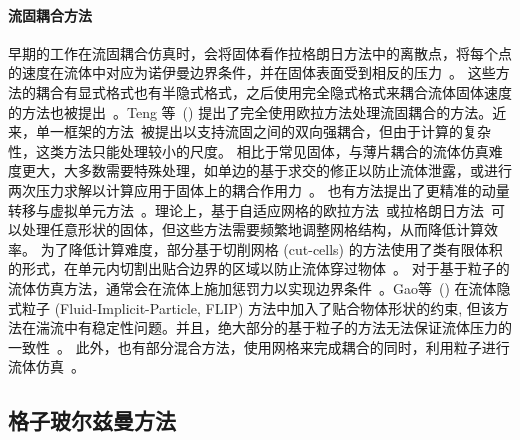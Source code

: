 \paragraph{流固耦合方法}
早期的工作在流固耦合仿真时，会将固体看作拉格朗日方法中的离散点，将每个点的速度在流体中对应为诺伊曼边界条件，并在固体表面受到相反的压力~\cite{Yngve:2000,Foster:2001,Carlson-2004,Takahashi-2002,Genevaux-2003}。
这些方法的耦合有显式格式也有半隐式格式，之后使用完全隐式格式来耦合流体固体速度的方法也被提出~\cite{Klingner-2006,Chentanez:2006:SCP,Batty-2007}。Teng 等~(\citeyear{Teng-2016}) 提出了完全使用欧拉方法处理流固耦合的方法。近来，单一框架的方法~\cite{takahashi-2020,fang-2020}被提出以支持流固之间的双向强耦合，但由于计算的复杂性，这类方法只能处理较小的尺度。
相比于常见固体，与薄片耦合的流体仿真难度更大，大多数需要特殊处理，如单边的基于求交的修正以防止流体泄露，或进行两次压力求解以计算应用于固体上的耦合作用力~\cite{Guendelman-2005}。
也有方法提出了更精准的动量转移与虚拟单元方法~\cite{Robinson-2008,Robinson:2009}。理论上，基于自适应网格的欧拉方法~\cite{Feldman:DF:2005,Feldman-2005,dai-2005,Klingner-2006,Elcott-2007}或拉格朗日方法~\cite{Misztal:2010,Clausen-2013}可以处理任意形状的固体，但这些方法需要频繁地调整网格结构，从而降低计算效率。
为了降低计算难度，部分基于切削网格 (cut-cells) 的方法使用了类有限体积的形式，在单元内切割出贴合边界的区域以防止流体穿过物体~\cite{Roble-2005,Batty-2007,Ng-2009,gibou-2012,weber-2015,Edwards-2014,Liu:2015:MVF,Azevedo-2016}。
对于基于粒子的流体仿真方法，通常会在流体上施加惩罚力以实现边界条件~\cite{peer-2015,Ihmsen-2013}。Gao等~(\citeyear{Gao:2017}) 在流体隐式粒子 (Fluid-Implicit-Particle, FLIP) 方法中加入了贴合物体形状的约束, 但该方法在湍流中有稳定性问题。并且，绝大部分的基于粒子的方法无法保证流体压力的一致性~\cite{band-2018}。
此外，也有部分混合方法，使用网格来完成耦合的同时，利用粒子进行流体仿真~\cite{Zhang-2016,Fei-2018,hu-2018,Fei-2019}。

\subsection{格子玻尔兹曼方法}
\label{sec:1_related_works_LBM}
